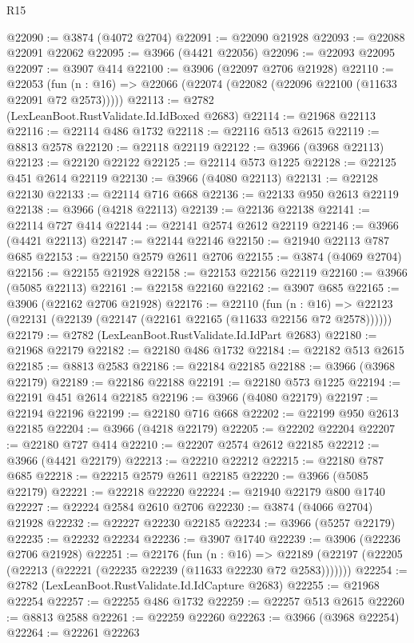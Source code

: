 \begin{lexlean}{R15}
\begin{coremodule}
@22090 := @3874 (@4072 @2704)
@22091 := @22090 @21928
@22093 := @22088 @22091 @22062
@22095 := @3966 (@4421 @22056)
@22096 := @22093 @22095
@22097 := @3907 @414
@22100 := @3906 (@22097 @2706 @21928)
@22110 := @22053
    (fun (n : @16) => @22066 (@22074 (@22082 (@22096 @22100 (@11633 @22091 @72 @2573)))))
@22113 := @2782 (LexLeanBoot.RustValidate.Id.IdBoxed @2683)
@22114 := @21968 @22113
@22116 := @22114 @486 @1732
@22118 := @22116 @513 @2615
@22119 := @8813 @2578
@22120 := @22118 @22119
@22122 := @3966 (@3968 @22113)
@22123 := @22120 @22122
@22125 := @22114 @573 @1225
@22128 := @22125 @451 @2614 @22119
@22130 := @3966 (@4080 @22113)
@22131 := @22128 @22130
@22133 := @22114 @716 @668
@22136 := @22133 @950 @2613 @22119
@22138 := @3966 (@4218 @22113)
@22139 := @22136 @22138
@22141 := @22114 @727 @414
@22144 := @22141 @2574 @2612 @22119
@22146 := @3966 (@4421 @22113)
@22147 := @22144 @22146
@22150 := @21940 @22113 @787 @685
@22153 := @22150 @2579 @2611 @2706
@22155 := @3874 (@4069 @2704)
@22156 := @22155 @21928
@22158 := @22153 @22156 @22119
@22160 := @3966 (@5085 @22113)
@22161 := @22158 @22160
@22162 := @3907 @685
@22165 := @3906 (@22162 @2706 @21928)
@22176 := @22110
    (fun (n : @16) => @22123 (@22131 (@22139 (@22147 (@22161 @22165 (@11633 @22156 @72 @2578))))))
@22179 := @2782 (LexLeanBoot.RustValidate.Id.IdPart @2683)
@22180 := @21968 @22179
@22182 := @22180 @486 @1732
@22184 := @22182 @513 @2615
@22185 := @8813 @2583
@22186 := @22184 @22185
@22188 := @3966 (@3968 @22179)
@22189 := @22186 @22188
@22191 := @22180 @573 @1225
@22194 := @22191 @451 @2614 @22185
@22196 := @3966 (@4080 @22179)
@22197 := @22194 @22196
@22199 := @22180 @716 @668
@22202 := @22199 @950 @2613 @22185
@22204 := @3966 (@4218 @22179)
@22205 := @22202 @22204
@22207 := @22180 @727 @414
@22210 := @22207 @2574 @2612 @22185
@22212 := @3966 (@4421 @22179)
@22213 := @22210 @22212
@22215 := @22180 @787 @685
@22218 := @22215 @2579 @2611 @22185
@22220 := @3966 (@5085 @22179)
@22221 := @22218 @22220
@22224 := @21940 @22179 @800 @1740
@22227 := @22224 @2584 @2610 @2706
@22230 := @3874 (@4066 @2704) @21928
@22232 := @22227 @22230 @22185
@22234 := @3966 (@5257 @22179)
@22235 := @22232 @22234
@22236 := @3907 @1740
@22239 := @3906 (@22236 @2706 @21928)
@22251 := @22176
    (fun (n : @16) =>
    @22189 (@22197 (@22205 (@22213 (@22221 (@22235 @22239 (@11633 @22230 @72 @2583)))))))
@22254 := @2782 (LexLeanBoot.RustValidate.Id.IdCapture @2683)
@22255 := @21968 @22254
@22257 := @22255 @486 @1732
@22259 := @22257 @513 @2615
@22260 := @8813 @2588
@22261 := @22259 @22260
@22263 := @3966 (@3968 @22254)
@22264 := @22261 @22263

\end{coremodule}
\end{lexlean}
